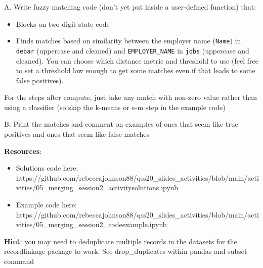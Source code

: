 \documentclass[11pt]{article}
\providecommand{\tightlist}{%
      \setlength{\itemsep}{0pt}\setlength{\parskip}{0pt}}
\begin{document}
    A. Write fuzzy matching code (don't yet put inside a user-defined
function) that:

\begin{itemize}
\tightlist
\item
  Blocks on two-digit state code
\item
  Finds matches based on similarity between the employer name
  (\texttt{Name}) in \texttt{debar} (uppercase and cleaned) and
  \texttt{EMPLOYER\_NAME} in \texttt{jobs} (uppercase and cleaned). You
  can choose which distance metric and threshold to use (feel free to
  set a threshold low enough to get some matches even if that leads to
  some false positives).
\end{itemize}

For the steps after compute, just take any match with non-zero value
rather than using a classifier (so skip the k-means or e-m step in the
example code)

B. Print the matches and comment on examples of ones that seem like true
positives and ones that seem like false matches

\textbf{Resources}:

\begin{itemize}
\tightlist
\item
  Solutions code here:
  https://github.com/rebeccajohnson88/qss20\_slides\_activities/blob/main/activities/05\_merging\_session2\_activitysolutions.ipynb
\item
  Example code here:
  https://github.com/rebeccajohnson88/qss20\_slides\_activities/blob/main/activities/05\_merging\_session2\_codeexample.ipynb
\end{itemize}

\textbf{Hint}: you may need to deduplicate multiple records in the
datasets for the recordlinkage package to work. See drop\_duplicates
within pandas and subset command
\end{document}
